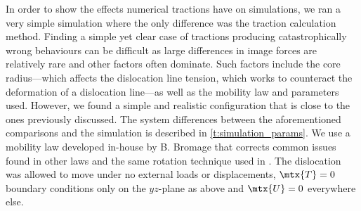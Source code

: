 \documentclass[11pt]{iopart}
\begin{document}
In order to show the effects numerical tractions have on simulations, we ran a very simple simulation where the only difference was the traction calculation method. Finding a simple yet clear case of tractions producing catastrophically wrong behaviours can be difficult as large differences in image forces are relatively rare and other factors often dominate. Such factors include the core radius---which affects the dislocation line tension, which works to counteract the deformation of a dislocation line---as well as the mobility law and parameters used. However, we found a simple and realistic configuration that is close to the ones previously discussed. The system differences between the aforementioned comparisons and the simulation is described in \cref{t:simulation_params}. We use a mobility law developed in-house by B. Bromage \cite{bromage2018calculating} that corrects common issues found in other laws and the same rotation technique used in \cite{YU2018}. The dislocation was allowed to move under no external loads or displacements, $\mtx{T} = 0$ boundary conditions only on the $yz$-plane as above and $\mtx{U} = 0$ everywhere else.
\end{document}
